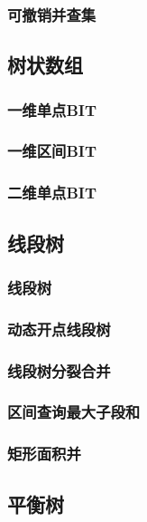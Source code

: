 ﻿\documentclass[a4paper,twocolumn]{article}
\begin{document}
\subsubsection{可撤销并查集}

\subsection{树状数组}
\subsubsection{一维单点BIT}

\subsubsection{一维区间BIT}

\subsubsection{二维单点BIT}

\subsection{线段树}
\subsubsection{线段树}

\subsubsection{动态开点线段树}

\subsubsection{线段树分裂合并}

\subsubsection{区间查询最大子段和}

\subsubsection{矩形面积并}

\subsection{平衡树}
\end{document}

